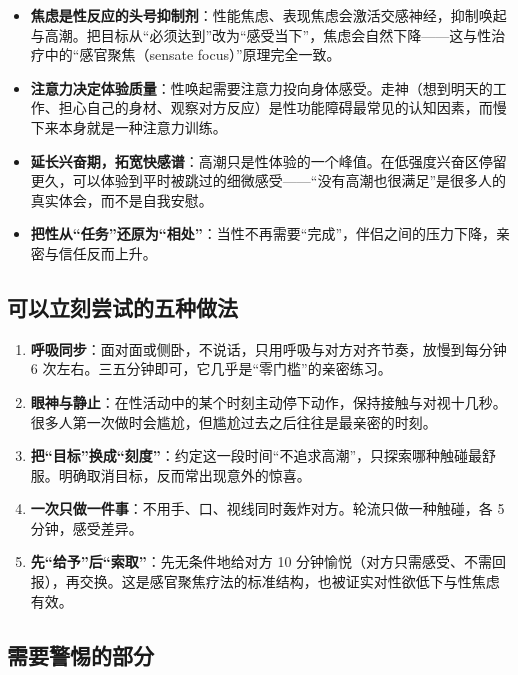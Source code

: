 \documentclass[12pt,UTF8]{ctexbook}
\begin{document}
\begin{itemize}
\item \textbf{焦虑是性反应的头号抑制剂}：性能焦虑、表现焦虑会激活交感神经，抑制唤起与高潮。把目标从“必须达到”改为“感受当下”，焦虑会自然下降——这与性治疗中的“感官聚焦（sensate focus）”原理完全一致。
\item \textbf{注意力决定体验质量}：性唤起需要注意力投向身体感受。走神（想到明天的工作、担心自己的身材、观察对方反应）是性功能障碍最常见的认知因素，而慢下来本身就是一种注意力训练。
\item \textbf{延长兴奋期，拓宽快感谱}：高潮只是性体验的一个峰值。在低强度兴奋区停留更久，可以体验到平时被跳过的细微感受——“没有高潮也很满足”是很多人的真实体会，而不是自我安慰。
\item \textbf{把性从“任务”还原为“相处”}：当性不再需要“完成”，伴侣之间的压力下降，亲密与信任反而上升。
\end{itemize}

\subsection{可以立刻尝试的五种做法}

\begin{enumerate}
\item \textbf{呼吸同步}：面对面或侧卧，不说话，只用呼吸与对方对齐节奏，放慢到每分钟 6 次左右。三五分钟即可，它几乎是“零门槛”的亲密练习。
\item \textbf{眼神与静止}：在性活动中的某个时刻主动停下动作，保持接触与对视十几秒。很多人第一次做时会尴尬，但尴尬过去之后往往是最亲密的时刻。
\item \textbf{把“目标”换成“刻度”}：约定这一段时间“不追求高潮”，只探索哪种触碰最舒服。明确取消目标，反而常出现意外的惊喜。
\item \textbf{一次只做一件事}：不用手、口、视线同时轰炸对方。轮流只做一种触碰，各 5 分钟，感受差异。
\item \textbf{先“给予”后“索取”}：先无条件地给对方 10 分钟愉悦（对方只需感受、不需回报），再交换。这是感官聚焦疗法的标准结构，也被证实对性欲低下与性焦虑有效。
\end{enumerate}

\subsection{需要警惕的部分}
\end{document}
